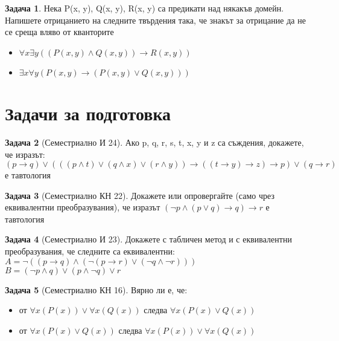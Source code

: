 \documentclass[10pt, a4paper]{article}
\theoremstyle{definition}
\newtheorem{problem}{Задача}
\theoremstyle{remark}
\begin{document}
\begin{problem}
Нека P(x, y), Q(x, y), R(x, y) са предикати над някакъв домейн. Напишете отрицанието на следните твърдения така, че знакът за отрицание да не се среща вляво от кванторите
    \begin{itemize}
        \item \(\forall x \exists y ((P(x,y)\wedge Q(x,y))\rightarrow R(x,y))\)
        \item \(\exists x \forall y (P(x,y) \rightarrow (P(x,y)\vee Q(x,y)))\)
    \end{itemize}
\end{problem}



\section{Задачи за подготовка}

\begin{problem}[Семестриално И 24] Ако p, q, r, s, t, x, y и z са съждения, докажете, че изразът:\\ \((p \rightarrow q) \vee (((p \wedge t) \vee (q \wedge x) \vee (r \wedge y)) \rightarrow ((t \rightarrow y) \rightarrow z) \rightarrow p) \vee (q \rightarrow r)\) е тавтология
\end{problem}


\begin{problem}[Семестриално КН 22] Докажете или опровергайте (само чрез еквивалентни преобразувания), че изразът \((\neg p \wedge (p \vee q) \rightarrow q) \rightarrow r\) е тавтология 
\end{problem}

\begin{problem}[Семестриално И 23] Докажете с табличен метод и с еквивалентни преобразувания, че следните са еквивалентни:\\
\(A=\neg( (p \rightarrow q) \wedge (\neg(p \rightarrow r) \vee (\neg q \wedge \neg r)) )\)\\
\(B=(\neg p \wedge q) \vee (p \wedge \neg q) \vee r\)
\end{problem}

\begin{problem}[Семестриално КН 16]
    Вярно ли е, че:
    \begin{itemize}
        \item от \(\forall x(P(x)) \vee \forall x(Q(x))\) следва \(\forall x(P(x)\vee Q(x))\) 
        \item от \(\forall x(P(x)\vee Q(x))\) следва \(\forall x(P(x)) \vee \forall x(Q(x))\) 
    \end{itemize}
\end{problem}
\end{document}
